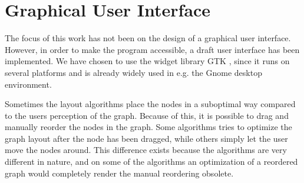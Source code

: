 \section{Graphical User Interface}

The focus of this work has not been on the design of a graphical user
interface. However, in order to make the program accessible, a draft user
interface has been implemented. We have chosen to use the widget library GTK
\cite{PyGTK}, since it runs on several platforms and is already widely used in
e.g. the Gnome desktop environment.

Sometimes the layout algorithms place the nodes in a suboptimal way compared
to the users perception of the graph. Because of this, it is possible to drag
and manually reorder the nodes in the graph. Some algorithms tries to optimize
the graph layout after the node has been dragged, while others simply let the
user move the nodes around. This difference exists because the algorithms are
very different in nature, and on some of the algorithms an optimization of a
reordered graph would completely render the manual reordering obsolete.